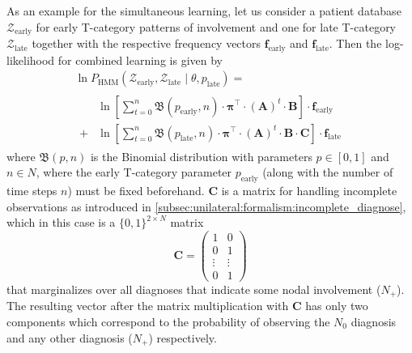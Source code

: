 \documentclass[\relativeRoot/main.tex]{subfiles}
\begin{document}
As an example for the simultaneous learning, let us consider a patient database $\boldsymbol{\mathcal{Z}}_\text{early}$ for early T-category patterns of involvement and one for late T-category $\boldsymbol{\mathcal{Z}}_\text{late}$ together with the respective frequency vectors $\mathbf{f}_\text{early}$ and $\mathbf{f}_\text{late}$. Then the log-likelihood for combined learning is given by
%
\begin{multline}
    \ln{ P_\text{HMM} \left( \boldsymbol{\mathcal{Z}}_\text{early}, \boldsymbol{\mathcal{Z}}_\text{late} \mid \theta, p_\text{late} \right) } =\\
    \begin{aligned}
        &\ln{ \left[ \sum_{t = 0}^n{ \mathfrak{B} \left( p_\text{early}, n \right) \cdot \boldsymbol{\pi}^\top \cdot \left( \mathbf{A} \right)^t \cdot \mathbf{B} } \right] } \cdot \mathbf{f}_\text{early} \\
        + &\ln{ \left[ \sum_{t = 0}^n{ \mathfrak{B} \left( p_\text{late}, n \right) \cdot \boldsymbol{\pi}^\top \cdot \left( \mathbf{A} \right)^t \cdot \mathbf{B} \cdot \mathbf{C} } \right] } \cdot \mathbf{f}_\text{late}
    \end{aligned}
\end{multline}
%
where $\mathfrak{B}(p,n)$ is the Binomial distribution with parameters $p \in [0,1]$ and $n \in N$, where the early T-category parameter $p_\text{early}$ (along with the number of time steps $n$) must be fixed beforehand. $\mathbf{C}$ is a matrix for handling incomplete observations as introduced in \cref{subsec:unilateral:formalism:incomplete_diagnose}, which in this case is a $\{ 0,1 \}^{2 \times N}$ matrix
%
\begin{equation}
    \mathbf{C} = \begin{pmatrix}
        1 & 0 \\
        0 & 1 \\
        \vdots & \vdots \\
        0 & 1
    \end{pmatrix}
\end{equation}
%
that marginalizes over all diagnoses that indicate some nodal involvement ($N_+$). The resulting vector after the matrix multiplication with $\mathbf{C}$ has only two components which correspond to the probability of observing the $N_0$ diagnosis and any other diagnosis ($N_+$) respectively.
\end{document}
